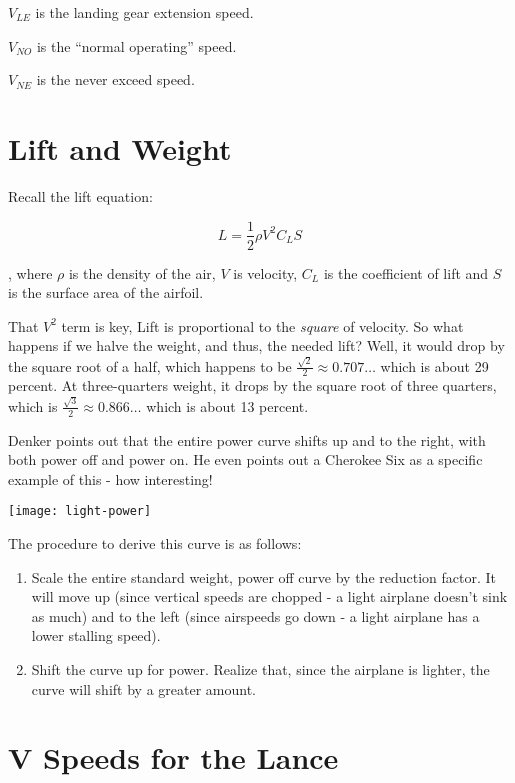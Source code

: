 $V_{LE}$ is the landing gear extension speed.

$V_{NO}$ is the ``normal operating'' speed.

$V_{NE}$ is the never exceed speed.

\section{Lift and Weight}

Recall the lift equation:

\begin{equation}
L = \frac{1}{2} \rho V^2 C_L S
\end{equation}

, where $\rho$ is the density of the air, $V$ is velocity, $C_L$ is the coefficient of lift and $S$ is the surface area of the airfoil.

That $V^2$ term is key, Lift is proportional to the \emph{square} of velocity. So what happens if we halve the weight, and thus, the needed lift? Well, it would drop by the square root of a half, which happens to be $\frac{\sqrt{2}}{2} \approx 0.707\ldots$ which is about 29 percent. At three-quarters weight, it drops by the square root of three quarters, which is $\frac{\sqrt{3}}{2} \approx 0.866\ldots$ which is about 13 percent.

Denker points out that the entire power curve shifts up and to the right, with both power off and power on. He even points out a Cherokee Six as a specific example of this - how interesting!

\texttt{[image: light-power]}

The procedure to derive this curve is as follows:

\begin{enumerate}
\item Scale the entire standard weight, power off curve by the reduction factor. It will move up (since vertical speeds are chopped - a light airplane doesn't sink as much) and to the left (since airspeeds go down - a light airplane has a lower stalling speed).
\item Shift the curve up for power. Realize that, since the airplane is lighter, the curve will shift by a greater amount.
\end{enumerate}


\section{V Speeds for the Lance}

